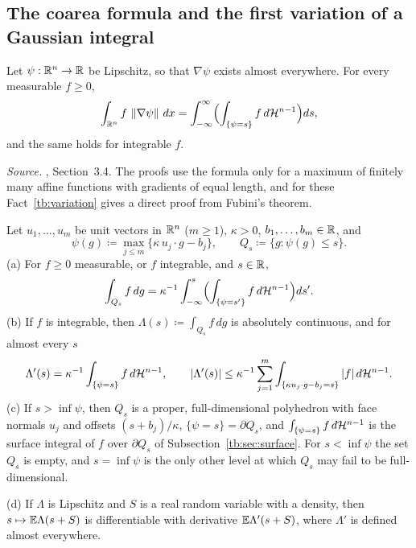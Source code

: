 \subsection{The coarea formula and the first variation of a Gaussian
integral}\label{tb:sec:coarea}

\begin{fact}\label{tb:coarea}
Let \(\psi:\mathbb R^n\to\mathbb R\) be Lipschitz, so that \(\nabla\psi\) exists almost
everywhere. For every measurable \(f\ge0\),
\[
 \int_{\mathbb R^n}f\,\left\lVert\nabla\psi\right\rVert\,dx=\int_{-\infty}^\infty
 \Bigl(\int_{\{\psi=s\}}f\,d\mathcal H^{n-1}\Bigr)ds ,
\]
and the same holds for integrable \(f\).
\end{fact}

\emph{Source.} , Section~3.4. The proofs use the formula only for
a maximum of finitely many affine functions with gradients of equal length, and
for these Fact~\ref{tb:variation} gives a direct proof from Fubini's theorem.

\begin{fact}\label{tb:variation}
Let \(u_1,\ldots,u_m\) be unit vectors in \(\mathbb R^n\) (\(m\ge1\)), \(\kappa>0\),
\(b_1,\ldots,b_m\in\mathbb R\), and
\[
 \psi(g)\coloneqq \max_{j\le m}\{\kappa\,u_j\cdot g-b_j\},\qquad Q_s\coloneqq \{g:\psi(g)\le s\}.
\]
(a) For \(f\ge0\) measurable, or \(f\) integrable, and \(s\in\mathbb R\),
\[
 \int_{Q_s}f\,dg=\kappa^{-1}\int_{-\infty}^s\Bigl(\int_{\{\psi=s'\}}f\,d\mathcal H^{n-1}
 \Bigr)ds'.
\]
(b) If \(f\) is integrable, then \(\Lambda(s)\coloneqq \int_{Q_s}f\,dg\) is absolutely
continuous, and for almost every \(s\)
\[
 \Lambda'(s)=\kappa^{-1}\int_{\{\psi=s\}}f\,d\mathcal H^{n-1},\qquad
 |\Lambda'(s)|\le\kappa^{-1}\sum_{j=1}^m\int_{\{\kappa u_j\cdot g-b_j=s\}}|f|\,d\mathcal H^{n-1}.
\]
(c) If \(s>\inf\psi\), then \(Q_s\) is a proper, full-dimensional polyhedron
with face normals \(u_j\) and offsets \((s+b_j)/\kappa\), \(\{\psi=s\}=\partial Q_s\),
and \(\int_{\{\psi=s\}}f\,d\mathcal H^{n-1}\) is the surface integral of \(f\) over
\(\partial Q_s\) of Subsection~\ref{tb:sec:surface}. For \(s<\inf\psi\) the set
\(Q_s\) is empty, and \(s=\inf\psi\) is the only other level at which \(Q_s\)
may fail to be full-dimensional.

(d) If \(\Lambda\) is Lipschitz and \(S\) is a real random variable with a
density, then \(s\mapsto\mathbb E\Lambda(s+S)\) is differentiable with derivative
\(\mathbb E\Lambda'(s+S)\), where \(\Lambda'\) is defined almost everywhere.
\end{fact}

